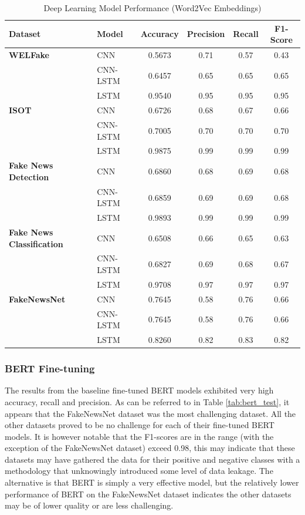 \documentclass[stu,12pt,floatsintext,donotrepeattitle]{apa7}
\begin{document}
\begin{table}[H]
\centering
\small
\caption{Deep Learning Model Performance (Word2Vec Embeddings)}
\label{tab:word2vec_dl}
\begin{tabular}{llcccc}
\toprule
\textbf{Dataset} & \textbf{Model} & \textbf{Accuracy} & \textbf{Precision} & \textbf{Recall} & \textbf{F1-Score} \\
\midrule
\textbf{WELFake} & CNN & 0.5673 & 0.71 & 0.57 & 0.43 \\
 & CNN-LSTM & 0.6457 & 0.65 & 0.65 & 0.65 \\
 & LSTM & 0.9540 & 0.95 & 0.95 & 0.95 \\
\midrule
\textbf{ISOT} & CNN & 0.6726 & 0.68 & 0.67 & 0.66 \\
 & CNN-LSTM & 0.7005 & 0.70 & 0.70 & 0.70 \\
 & LSTM & 0.9875 & 0.99 & 0.99 & 0.99 \\
\midrule
\textbf{Fake News Detection} & CNN & 0.6860 & 0.68 & 0.69 & 0.68 \\
 & CNN-LSTM & 0.6859 & 0.69 & 0.69 & 0.68 \\
 & LSTM & 0.9893 & 0.99 & 0.99 & 0.99 \\
\midrule
\textbf{Fake News Classification} & CNN & 0.6508 & 0.66 & 0.65 & 0.63 \\
 & CNN-LSTM & 0.6827 & 0.69 & 0.68 & 0.67 \\
 & LSTM & 0.9708 & 0.97 & 0.97 & 0.97 \\
\midrule
\textbf{FakeNewsNet} & CNN & 0.7645 & 0.58 & 0.76 & 0.66 \\
 & CNN-LSTM & 0.7645 & 0.58 & 0.76 & 0.66 \\
 & LSTM & 0.8260 & 0.82 & 0.83 & 0.82 \\
\bottomrule
\end{tabular}
\end{table}

\subsubsection{BERT Fine-tuning}
The results from the baseline fine-tuned BERT models exhibited very high accuracy, recall and precision. As can be referred to in Table \ref{tab:bert_test}, it appears that the FakeNewsNet dataset was the most challenging dataset. All the other datasets proved to be no challenge for each of their fine-tuned BERT models. It is however notable that the F1-scores are in the range (with the exception of the FakeNewsNet dataset) exceed 0.98, this may indicate that these datasets may have gathered the data for their positive and negative classes with a methodology that unknowingly introduced some level of data leakage. The alternative is that BERT is simply a very effective model, but the relatively lower performance of BERT on the FakeNewsNet dataset indicates the other datasets may be of lower quality or are less challenging. 
\end{document}
